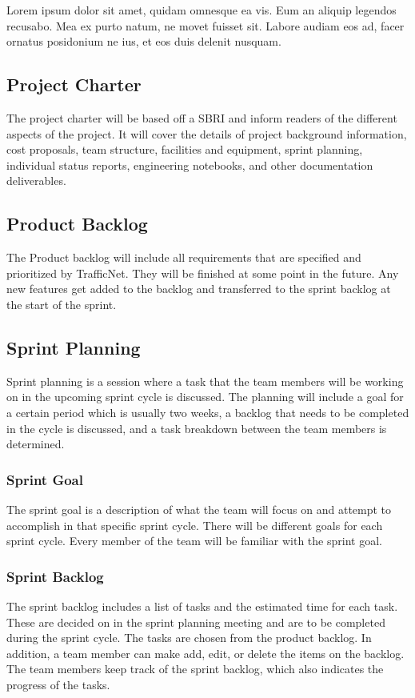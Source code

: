 Lorem ipsum dolor sit amet, quidam omnesque ea vis. Eum an aliquip legendos recusabo. Mea ex purto natum, ne movet fuisset sit. Labore audiam eos ad, facer ornatus posidonium ne ius, et eos duis delenit nusquam.

\subsection{Project Charter}
The project charter will be based off a SBRI and inform readers of the different aspects of the project. It will cover the details of project background information, cost proposals, team structure, facilities and equipment, sprint planning, individual status reports, engineering notebooks, and other documentation deliverables.

\subsection{Product Backlog}
The Product backlog will include all requirements that are specified and prioritized by TrafficNet. They will be finished at some point in the future. Any new features get added to the backlog and transferred to the sprint backlog at the start of the sprint.

\subsection{Sprint Planning}
Sprint planning is a session where a task that the team members will be working on in the upcoming sprint cycle is discussed. The planning will include a goal for a certain period which is usually two weeks, a backlog that needs to be completed in the cycle is discussed, and a task breakdown between the team members is determined. 

\subsubsection{Sprint Goal}
The sprint goal is a description of what the team will focus on and attempt to accomplish in that specific sprint cycle. There will be different goals for each sprint cycle. Every member of the team will be familiar with the sprint goal.

\subsubsection{Sprint Backlog}
The sprint backlog includes a list of tasks and the estimated time for each task. These are decided on in the sprint planning meeting and are to be completed during the sprint cycle. The tasks are chosen from the product backlog. In addition, a team member can make add, edit, or delete the items on the backlog. The team members keep track of the sprint backlog, which also indicates the progress of the tasks.

